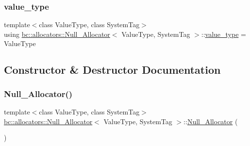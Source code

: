 \subsubsection{\texorpdfstring{value\+\_\+type}{value\_type}}
{\footnotesize\ttfamily template$<$class Value\+Type, class System\+Tag$>$ \\
using \hyperlink{structbc_1_1allocators_1_1Null__Allocator}{bc\+::allocators\+::\+Null\+\_\+\+Allocator}$<$ Value\+Type, System\+Tag $>$\+::\hyperlink{structbc_1_1allocators_1_1Null__Allocator_ac6562bbd777fc64599fdc6720f093815}{value\+\_\+type} =  Value\+Type}



\subsection{Constructor \& Destructor Documentation}
\mbox{\label{structbc_1_1allocators_1_1Null__Allocator_a8598c55919a51313080d6eba7020ecaa}} 
\subsubsection{\texorpdfstring{Null\+\_\+\+Allocator()}{Null\_Allocator()}\hspace{0.1cm}{\footnotesize\ttfamily [1/4]}}
{\footnotesize\ttfamily template$<$class Value\+Type, class System\+Tag$>$ \\
\hyperlink{structbc_1_1allocators_1_1Null__Allocator}{bc\+::allocators\+::\+Null\+\_\+\+Allocator}$<$ Value\+Type, System\+Tag $>$\+::\hyperlink{structbc_1_1allocators_1_1Null__Allocator}{Null\+\_\+\+Allocator} (\begin{DoxyParamCaption}{ }\end{DoxyParamCaption})\hspace{0.3cm}{\ttfamily [default]}}

\mbox{\label{structbc_1_1allocators_1_1Null__Allocator_a92db1e5e99f7a57c0dc260a40470ba86}} 
